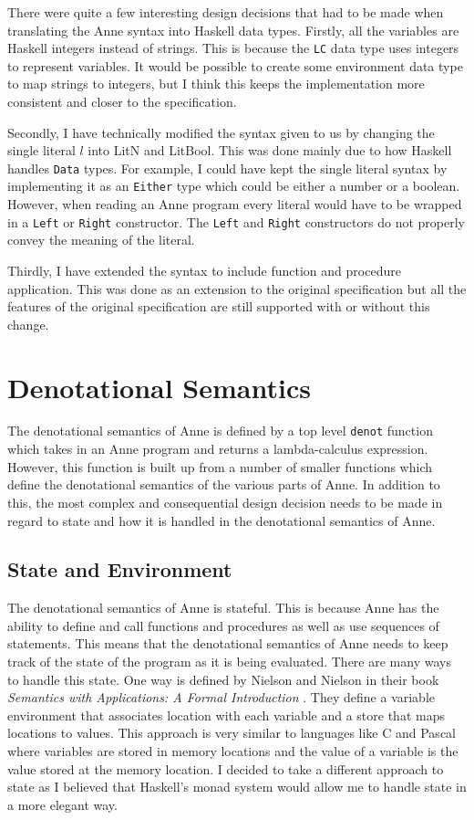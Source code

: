 There were quite a few interesting design decisions that had to be made when
translating the Anne syntax into Haskell data types. Firstly, all the variables
are Haskell integers instead of strings. This is because the \texttt{LC} data
type uses integers to represent variables. It would be possible to create some
environment data type to map strings to integers, but I think this keeps the
implementation more consistent and closer to the specification.

Secondly, I have technically modified the syntax given to us by changing the
single literal $l$ into LitN and LitBool. This was done mainly due to how
Haskell handles \texttt{Data} types. For example, I could have kept the single
literal syntax by implementing it as an \texttt{Either} type which could be
either a number or a boolean. However, when reading an Anne program every
literal would have to be wrapped in a \texttt{Left} or \texttt{Right}
constructor. The \texttt{Left} and \texttt{Right} constructors do not properly
convey the meaning of the literal.

Thirdly, I have extended the syntax to include function and procedure
application. This was done as an extension to the original specification but
all the features of the original specification are still supported with or
without this change.

\section{Denotational Semantics}

The denotational semantics of Anne is defined by a top level \texttt{denot} function which
takes in an Anne program and returns a lambda-calculus expression. However, this function
is built up from a number of smaller functions which define the denotational semantics of
the various parts of Anne. In addition to this, the most complex and consequential
design decision needs to be made in regard to state and how it is handled in the
denotational semantics of Anne.

\subsection{State and Environment}
\label{section:state}

The denotational semantics of Anne is stateful. This is because Anne has the
ability to define and call functions and procedures as well as use sequences of
statements. This means that the denotational semantics of Anne needs to keep
track of the state of the program as it is being evaluated. There are many ways
to handle this state. One way is defined by Nielson and Nielson in their book
\textit{Semantics with Applications: A Formal Introduction} \cite{nielsonsemantics}.
They define a variable environment that associates location with each variable and
a store that maps locations to values. This approach is very similar to languages
like C and Pascal where variables are stored in memory locations and the value of
a variable is the value stored at the memory location. I decided to take a different
approach to state as I believed that Haskell's monad system would allow me to
handle state in a more elegant way.

